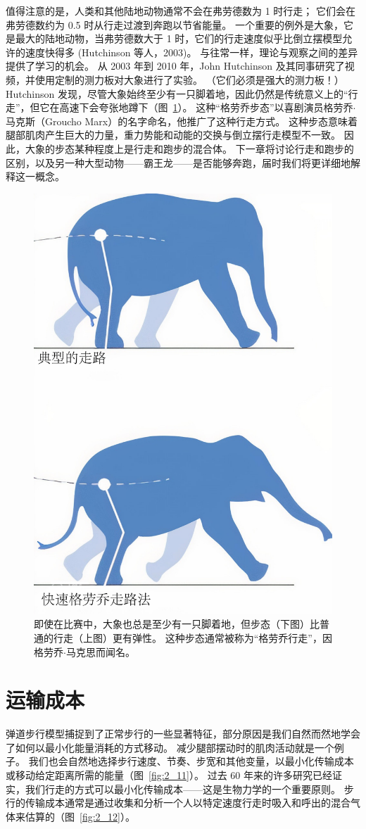 值得注意的是，人类和其他陆地动物通常不会在弗劳德数为 1 时行走；
它们会在弗劳德数约为 0.5 时从行走过渡到奔跑以节省能量。
一个重要的例外是大象，它是最大的陆地动物，当弗劳德数大于 1 时，它们的行走速度似乎比倒立摆模型允许的速度快得多 (Hutchinson 等人，2003)。
与往常一样，理论与观察之间的差异提供了学习的机会。
从 2003 年到 2010 年，John Hutchinson 及其同事研究了视频，并使用定制的测力板对大象进行了实验。
（它们必须是强大的测力板！）
Hutchinson 发现，尽管大象始终至少有一只脚着地，因此仍然是传统意义上的“行走”，但它在高速下会夸张地蹲下（图~\ref{fig:2_10}）。
这种“格劳乔步态”以喜剧演员格劳乔$\cdot$马克斯（Groucho Marx）的名字命名，他推广了这种行走方式。
这种步态意味着腿部肌肉产生巨大的力量，重力势能和动能的交换与倒立摆行走模型不一致。
因此，大象的步态某种程度上是行走和跑步的混合体。
下一章将讨论行走和跑步的区别，以及另一种大型动物——霸王龙——是否能够奔跑，届时我们将更详细地解释这一概念。

\begin{figure}[!htb]
	\centering
	\includegraphics[width=0.4\linewidth]{chap2/2_10}
	\caption{即使在比赛中，大象也总是至少有一只脚着地，但步态（下图）比普通的行走（上图）更有弹性。
		这种步态通常被称为“格劳乔行走”，因格劳乔$\cdot$马克思而闻名。 \label{fig:2_10}}
\end{figure}


\section{运输成本}

弹道步行模型捕捉到了正常步行的一些显著特征，部分原因是我们自然而然地学会了如何以最小化能量消耗的方式移动。
减少腿部摆动时的肌肉活动就是一个例子。
我们也会自然地选择步行速度、节奏、步宽和其他变量，以最小化传输成本或移动给定距离所需的能量（图~\ref{fig:2_11}）。
过去 60 年来的许多研究已经证实，我们行走的方式可以最小化传输成本——这是生物力学的一个重要原则。
步行的传输成本通常是通过收集和分析一个人以特定速度行走时吸入和呼出的混合气体来估算的（图~\ref{fig:2_12}）。

